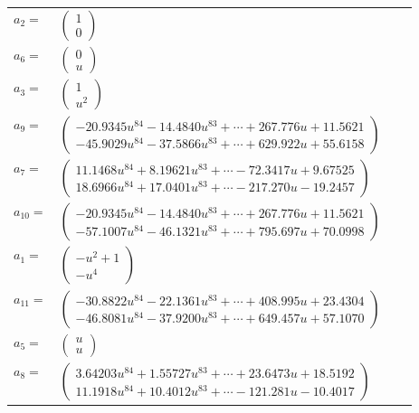 \documentclass[1p]{elsarticle_modified}
\theoremstyle{definition}
\begin{document}
\begin{tabular}{m{7pt} m{180pt} m{7pt} m{180pt} }
\flushright $a_{2}=$&$\begin{pmatrix}1\\0\end{pmatrix}$ \\
\flushright $a_{6}=$&$\begin{pmatrix}0\\u\end{pmatrix}$ \\
\flushright $a_{3}=$&$\begin{pmatrix}1\\u^2\end{pmatrix}$ \\
\flushright $a_{9}=$&$\begin{pmatrix}-20.9345 u^{84}-14.4840 u^{83}+\cdots+267.776 u+11.5621\\-45.9029 u^{84}-37.5866 u^{83}+\cdots+629.922 u+55.6158\end{pmatrix}$ \\
\flushright $a_{7}=$&$\begin{pmatrix}11.1468 u^{84}+8.19621 u^{83}+\cdots-72.3417 u+9.67525\\18.6966 u^{84}+17.0401 u^{83}+\cdots-217.270 u-19.2457\end{pmatrix}$ \\
\flushright $a_{10}=$&$\begin{pmatrix}-20.9345 u^{84}-14.4840 u^{83}+\cdots+267.776 u+11.5621\\-57.1007 u^{84}-46.1321 u^{83}+\cdots+795.697 u+70.0998\end{pmatrix}$ \\
\flushright $a_{1}=$&$\begin{pmatrix}- u^2+1\\- u^4\end{pmatrix}$ \\
\flushright $a_{11}=$&$\begin{pmatrix}-30.8822 u^{84}-22.1361 u^{83}+\cdots+408.995 u+23.4304\\-46.8081 u^{84}-37.9200 u^{83}+\cdots+649.457 u+57.1070\end{pmatrix}$ \\
\flushright $a_{5}=$&$\begin{pmatrix}u\\u\end{pmatrix}$ \\
\flushright $a_{8}=$&$\begin{pmatrix}3.64203 u^{84}+1.55727 u^{83}+\cdots+23.6473 u+18.5192\\11.1918 u^{84}+10.4012 u^{83}+\cdots-121.281 u-10.4017\end{pmatrix}$ \\

\end{tabular}
\end{document}
